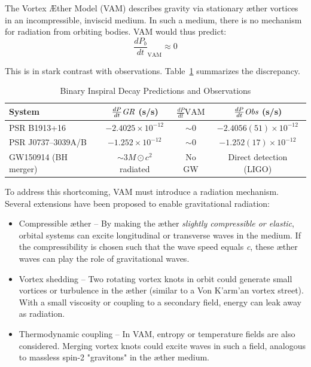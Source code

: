\documentclass[a4paper, aps,preprint,superscriptaddress, 12pt]{revtex4}
\begin{document}
The Vortex Æther Model (VAM) describes gravity via stationary æther vortices in an incompressible, inviscid medium. In such a medium, there is no mechanism for radiation from orbiting bodies. VAM would thus predict:
\begin{equation}
\frac{dP_b}{dt}_\text{VAM} \approx 0
\end{equation}

This is in stark contrast with observations. Table~\ref{tab:gw_comparison} summarizes the discrepancy.

\begin{table}[h!]
\centering
\caption{Binary Inspiral Decay Predictions and Observations}
\label{tab:gw_comparison}
\begin{tabular}{lccc}
\toprule
System & $\frac{dP}{dt}\textit{\text{GR}}$ (s/s) & $\frac{dP}{dt}\text{VAM}$ & $\frac{dP}{dt}\textit{\text{Obs}}$ (s/s) \\
\midrule
PSR B1913+16 & $-2.4025\times10^{-12}$ & $\sim 0$ & $-2.4056(51)\times10^{-12}$ \\
PSR J0737--3039A/B & $-1.252\times10^{-12}$ & $\sim 0$ & $-1.252(17)\times10^{-12}$ \\
GW150914 (BH merger) & $\sim 3M\odot c^2$ radiated & No GW & Direct detection (LIGO) \\
\bottomrule
\end{tabular}
\end{table}

To address this shortcoming, VAM must introduce a radiation mechanism. Several extensions have been proposed to enable gravitational radiation:

\begin{itemize}
\item Compressible æther – By making the æther \textit{slightly compressible or elastic}, orbital systems can excite longitudinal or transverse waves in the medium. If the compressibility is chosen such that the wave speed equals \textit{c}, these æther waves can play the role of gravitational waves.
\item Vortex shedding – Two rotating vortex knots in orbit could generate small vortices or turbulence in the æther (similar to a Von K'arm'an vortex street). With a small viscosity or coupling to a secondary field, energy can leak away as radiation.
\item Thermodynamic coupling – In VAM, entropy or temperature fields are also considered. Merging vortex knots could excite waves in such a field, analogous to massless spin-2 "gravitons" in the æther medium.
\end{itemize}
\end{document}

